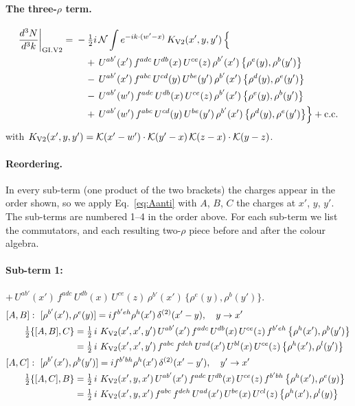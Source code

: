 \documentclass[10pt]{article}
\numberwithin{equation}{section}
\newcommand{\KK}{\mathcal K}
\newcommand{\NN}{\mathcal N}
\begin{document}
\paragraph{The three-$\rho$ term.}
\begin{align}
\frac{d^3N}{d^3k}\bigg|_{\rm GI.V2}={}&-\tfrac12i\,\NN\int e^{-ik\cdot(w'-x)}\,K_{\rm V2}(x',y,y')\,\Big\{\notag\\
&\quad +\,U^{ab'}(x')\,f^{adc}\,U^{db}(x)\,U^{ce}(z)\,\rho^{b'}(x')\,\big\{\rho^{e}(y),\rho^{b}(y')\big\}\notag\\
&\quad -\,U^{ab'}(x')\,f^{abc}\,U^{cd}(y)\,U^{be}(y')\,\rho^{b'}(x')\,\big\{\rho^{d}(y),\rho^{e}(y')\big\}\notag\\
&\quad -\,U^{ab'}(w')\,f^{adc}\,U^{db}(x)\,U^{ce}(z)\,\rho^{b'}(x')\,\big\{\rho^{e}(y),\rho^{b}(y')\big\}\notag\\
&\quad +\,U^{ab'}(w')\,f^{abc}\,U^{cd}(y)\,U^{be}(y')\,\rho^{b'}(x')\,\big\{\rho^{d}(y),\rho^{e}(y')\big\}\Big\}+{\rm c.c.}\label{eq:in-GI.V2}
\end{align}
with $K_{\rm V2}(x',y,y')=\KK(x'-w')\cdot\KK(y'-x)\,\KK(z-x)\cdot\KK(y-z)$.
\paragraph{Reordering.} In every sub-term (one product of the two brackets) the charges appear in the order shown, so we apply Eq.~\eqref{eq:Aanti} with $A$, $B$, $C$ the charges at $x'$, $y$, $y'$. The sub-terms are numbered 1--4 in the order above. For each sub-term we list the commutators, and each resulting two-$\rho$ piece before and after the colour algebra.
\paragraph{Sub-term 1:} $+\,U^{ab'}(x')\,f^{adc}\,U^{db}(x)\,U^{ce}(z)\,\rho^{b'}(x')\,\big\{\rho^{e}(y),\rho^{b}(y')\big\}$.
\begin{align}
&[A,B]:\ [\rho^{b'}(x'),\rho^{e}(y)]=i f^{b'eh}\rho^{h}(x')\,\delta^{(2)}(x'-y),\quad y\to x'\notag\\
&\qquad \tfrac12\{[A,B],C\}=\tfrac12\,i\,\,K_{\rm V2}(x',x',y')\,U^{ab'}(x')\,f^{adc}\,U^{db}(x)\,U^{ce}(z)\,f^{b'eh}\,\big\{\rho^{h}(x'),\rho^{b}(y')\big\}\notag\\
&\qquad\phantom{\tfrac12\{[A,B],C\}}=\tfrac12\,i\,\,K_{\rm V2}(x',x',y')\,f^{abc}\,f^{deh}\,U^{ad}(x')\,U^{bl}(x)\,U^{ce}(z)\,\big\{\rho^{h}(x'),\rho^{l}(y')\big\}
\label{eq:GI.V2-1-AB}\\
&[A,C]:\ [\rho^{b'}(x'),\rho^{b}(y')]=i f^{b'bh}\rho^{h}(x')\,\delta^{(2)}(x'-y'),\quad y'\to x'\notag\\
&\qquad \tfrac12\{[A,C],B\}=\tfrac12\,i\,\,K_{\rm V2}(x',y,x')\,U^{ab'}(x')\,f^{adc}\,U^{db}(x)\,U^{ce}(z)\,f^{b'bh}\,\big\{\rho^{h}(x'),\rho^{e}(y)\big\}\notag\\
&\qquad\phantom{\tfrac12\{[A,C],B\}}=\tfrac12\,i\,\,K_{\rm V2}(x',y,x')\,f^{abc}\,f^{deh}\,U^{ad}(x')\,U^{be}(x)\,U^{cl}(z)\,\big\{\rho^{h}(x'),\rho^{l}(y)\big\}
\label{eq:GI.V2-1-AC}
\end{align}
\end{document}
